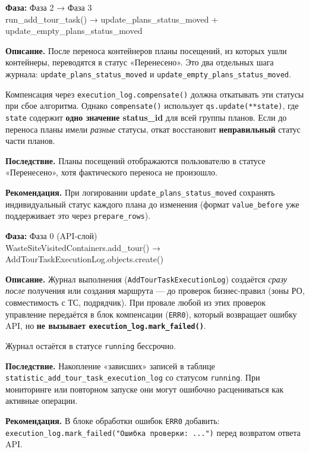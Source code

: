 \documentclass[11pt, a4paper, oneside]{article}
\newcommand{\coderef}[1]{{\footnotesize\color{MidGray}\ttfamily #1}}
\begin{document}
\begin{critbox}[title={🔴 \#2 — Статусы исходных планов посещений не откатываются}]

\textbf{Фаза:} Фаза 2 → Фаза 3\\
\coderef{run\_add\_tour\_task() → update\_plans\_status\_moved + update\_empty\_plans\_status\_moved}

\textbf{Описание.}
После переноса контейнеров планы посещений, из которых ушли контейнеры,
переводятся в статус «Перенесено». Это два отдельных шага журнала:
\texttt{update\_plans\_status\_moved} и \texttt{update\_empty\_plans\_status\_moved}.

Компенсация через \texttt{execution\_log.compensate()} должна откатывать
эти статусы при сбое алгоритма. Однако \texttt{compensate()} использует
\texttt{qs.update(**state)}, где \texttt{state} содержит \textbf{одно значение status\_id}
для всей группы планов. Если до переноса планы имели \emph{разные} статусы,
откат восстановит \textbf{неправильный} статус части планов.

\textbf{Последствие.} Планы посещений отображаются пользователю
в статусе «Перенесено», хотя фактического переноса не произошло.

\textbf{Рекомендация.}
При логировании \texttt{update\_plans\_status\_moved} сохранять
индивидуальный статус каждого плана до изменения
(формат \texttt{value\_before} уже поддерживает это через \texttt{prepare\_rows}).
\end{critbox}

\begin{critbox}[title={🔴 \#3 — Журнал выполнения зависает при ранних ошибках API}]

\textbf{Фаза:} Фаза 0 (API-слой)\\
\coderef{WasteSiteVisitedContainers.add\_tour() → AddTourTaskExecutionLog.objects.create()}

\textbf{Описание.}
Журнал выполнения (\texttt{AddTourTaskExecutionLog}) создаётся
\emph{сразу после} получения или создания маршрута — до проверок бизнес-правил
(зоны РО, совместимость с ТС, подрядчик).
При провале любой из этих проверок управление передаётся в блок компенсации
(\texttt{ERR0}), который возвращает ошибку API, но \textbf{не вызывает
\texttt{execution\_log.mark\_failed()}}.

Журнал остаётся в статусе \texttt{running} бессрочно.

\textbf{Последствие.} Накопление «зависших» записей в таблице
\texttt{statistic\_add\_tour\_task\_execution\_log}
со статусом \texttt{running}. При мониторинге или повторном запуске
они могут ошибочно расцениваться как активные операции.

\textbf{Рекомендация.}
В блоке обработки ошибок \texttt{ERR0} добавить:
\texttt{execution\_log.mark\_failed("Ошибка проверки: ...")}
перед возвратом ответа API.
\end{critbox}
\end{document}
